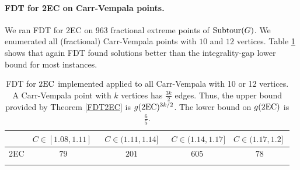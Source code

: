 \paragraph{FDT for 2EC on Carr-Vempala points.}
We ran FDT for 2EC on 963 fractional extreme points of $\operatorname{{Subtour}}(G)$. We enumerated all (fractional) Carr-Vempala points with $10$ and $12$ vertices. Table \ref{table2EC} shows that again FDT found solutions better than the integrality-gap lower bound for most instances. 
\begin{table}[h!]
	\begin{small}
		\centering
		\begin{tabular}{c c c c c}
			\hline
			& $C\in [1.08,1.11]\;$ & $\;C\in (1.11,1.14]\;$ &
			$\;C\in (1.14,1.17]$ &\; $C\in (1.17,1.2]\;$ \\ \hline
			2EC & $79$ & $201$ & $605$ & $78$ \\ \hline\\
		\end{tabular}	\caption{FDT for $\2ec$ implemented applied to all Carr-Vempala with 10 or 12 vertices. A Carr-Vempala point with $k$ vertices has $\frac{3k}{2}$ edges. Thus, the upper bound provided by Theorem \ref{FDT2EC} is $g(\2ec)^{3k/2}$. The lower bound on $g(\2ec)$ is $\frac{6}{5}$.}
		\label{table2EC}
	\end{small}
\end{table}


